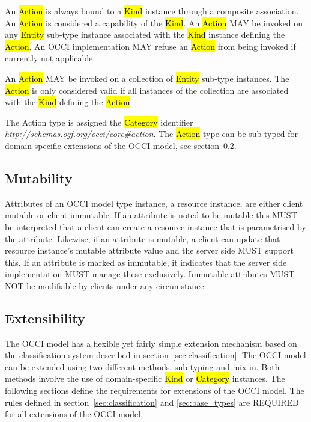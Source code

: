 \documentclass[10pt,a4paper,british]{article}
\begin{document}

An \hl{Action} is always bound to a \hl{Kind} instance through a composite
association. An \hl{Action} is considered a capability of the \hl{Kind}.  An
\hl{Action} MAY be invoked on any \hl{Entity} sub-type instance associated with
the \hl{Kind} instance defining the \hl{Action}. An OCCI implementation MAY
refuse an \hl{Action} from being invoked if currently not applicable.

An \hl{Action} MAY be invoked on a collection of \hl{Entity} sub-type instances.
The \hl{Action} is only considered valid if all instances of the collection are
associated with the \hl{Kind} defining the \hl{Action}.

The Action type is assigned the \hl{Category} identifier
\textit{http://schemas.ogf.org/occi/core\#action}.
%
The \hl{Action} type can be sub-typed for domain-specific extensions of the
OCCI model, see section~\ref{sec:extensibility}.

\subsection{Mutability}
Attributes of an OCCI model type instance, a resource instance, are
either client mutable or client immutable. If an attribute is noted to
be mutable this MUST be interpreted that a client can create a
resource instance that is parametrised by the attribute. Likewise, if
an attribute is mutable, a client can update that resource instance's
mutable attribute value and the server side MUST support this. If an
attribute is marked as immutable, it indicates that the server side
implementation MUST manage these exclusively. Immutable attributes
MUST NOT be modifiable by clients under any circumstance.

\subsection{Extensibility}
\label{sec:extensibility}
The OCCI model has a flexible yet fairly simple extension mechanism based on
the classification system described in section~\ref{sec:classification}.
%
The OCCI model can be extended using two different methods, sub-typing and
mix-in. Both methods involve the use of domain-specific \hl{Kind} or
\hl{Category} instances. The following sections define the requirements for
extensions of the OCCI model.
%
The rules defined in section~\ref{sec:classification} and \ref{sec:base_types}
are REQUIRED for all extensions of the OCCI model.
\end{document}
